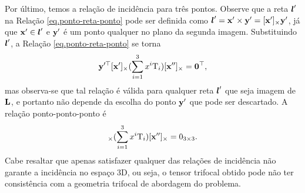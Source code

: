 Por último, temos a relação de incidência para três pontos. 
Observe que a reta $\boldsymbol{l}'$ na Relação \ref{eq.ponto-reta-ponto} pode ser definida como $\boldsymbol{l}'=\mathbf{x}'\times {\bf y}'=[\mathbf{x}']_\times {\bf y}'$, já que $\mathbf{x}'\in\boldsymbol{l}'$ e ${\bf y}'$ é um ponto qualquer no plano da segunda imagem. Substituindo $\boldsymbol{l}'$, a Relação \ref{eq.ponto-reta-ponto} se torna 
\begin{equation*}
{\bf y}'^\top[\mathbf{x}']_\times(\sum_{i=1}^3 x^i\mbox{T}_i)[\mathbf{x}'']_\times={\bf 0}^\top,
\end{equation*}
mas observa-se que tal relação é válida para qualquer reta $\boldsymbol{l}'$ que seja imagem de ${\bf L}$, e portanto não depende da escolha do ponto ${\bf y}'$ que pode ser descartado. A relação ponto-ponto-ponto é
\begin{equation*}
[\x']_\times(\sum_{i=1}^3 x^i\mbox{T}_i)[\x'']_\times=0_{3\times3}.
\end{equation*}
Cabe resaltar que apenas satisfazer qualquer das relações de incidência não garante a incidência no espaço 3D, ou seja, o tensor trifocal obtido pode não ter consistência com a geometria trifocal de abordagem do problema.

